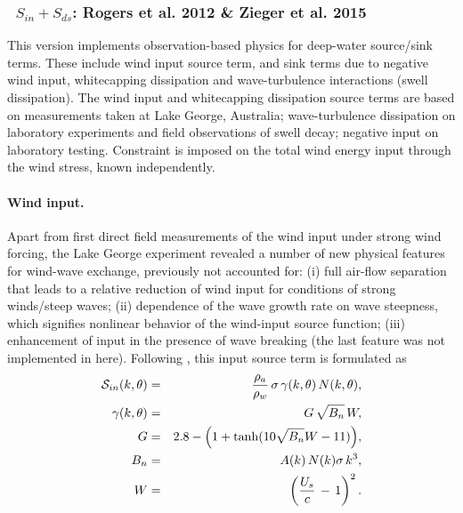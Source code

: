 \vsssub
\subsubsection{~$S_{in} + S_{ds}$: Rogers et al. 2012 \& Zieger et al. 2015} \label{sec:ST6}
\vsssub


\noindent
This version implements observation-based physics for deep-water source/sink terms. These include wind input
source term, and sink terms due to negative wind input, whitecapping
dissipation and wave-turbulence interactions (swell dissipation).
The wind input and whitecapping dissipation source terms are based on
measurements taken at Lake George, Australia; wave-turbulence dissipation
on laboratory experiments and field observations of swell decay; negative
input on laboratory testing. Constraint is imposed on the total wind
energy input through the wind stress, known independently.

\paragraph{Wind input.} Apart from first direct field measurements
of the wind input under strong wind forcing,  the Lake George experiment
revealed a number of new physical features for wind-wave exchange,
previously not accounted for:
(i) full air-flow separation that leads to a relative reduction of
wind input for conditions of strong winds/steep waves;
(ii) dependence of the wave growth rate on wave steepness,
which signifies nonlinear behavior of the wind-input source function;
(iii) enhancement of input in the presence of wave breaking
\citep{art:Dea06,art:Bea07} (the last feature was not implemented in here).
Following \citet{art:RBW12}, this input source term is formulated as
\begin{eqnarray}
\cS_{in}(k,\theta) & = & \frac{\rho_a}{\rho_w}\, \sigma\,\gamma(k,\theta)\,N(k,\theta)  ,
\label{eq:ST601} \\ \gamma(k,\theta) &=& G\,\sqrt{B_n}\,W  ,
\label{eq:ST602} \\
G                &=& 2.8-\Bigl (1+\tanh (10\sqrt{B_n}W-11) \Bigr)  ,
\label{eq:ST603} \\
B_n              &=& A(k)\,N(k)\sigma\,k^3  ,
\label{eq:ST604} \\
W                &=& \left (\frac{U_s}{c}\,-\,1 \right )^2  .
\label{eq:ST605}
\end{eqnarray}

